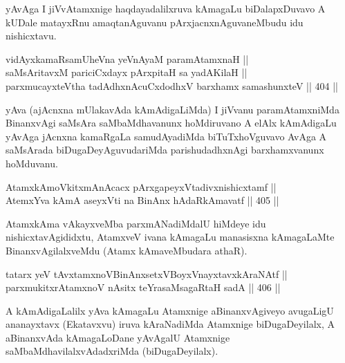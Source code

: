 \begin{artha}
yAvAga I jiVvAtamxnige haqdayadalilxruva kAmagaLu biDalapxDuvavo A
kUDale matayxRnu amaqtanAguvanu pArxjacnxnAguvaneMbudu idu nishicxtavu.
\end{artha}

\begin{shl}
vidAyxkamaRsamUheVna yeVnAyaM paramAtamxnaH || \\
saMsAritavxM pariciCxdayx pArxpitaH sa yadA\s KilaH || \\
parxmucayxteV\s tha tadAdhxnAcuCxdodhxV barxhamx samashunxteV \hfill || 404 ||  
\end{shl}

\begin{artha}
yAva (ajAcnxna mUlakavAda kAmAdigaLiMda) I jiVvanu paramAtamxniMda
BinanxvAgi saMsAra saMbaMdhavanunx hoMdiruvano A elAlx kAmAdigaLu yAvAga
jAcnxna kamaRgaLa samudAyadiMda biTuTxhoVguvavo AvAga A saMsArada
biDugaDeyAguvudariMda parishudadhxnAgi barxhamxvanunx hoMduvanu.
\end{artha}

\begin{shl}
AtamxkAmoVkitxmAnAcacx pArxgapeyxVtadivxnishicxtamf || \\
AtemxYva kAmA aseyxVti na BinAnx hAdaRkAmavatf \hfill || 405 ||  
\end{shl}

\begin{artha}
AtamxkAma vAkayxveMba parxmANadiMdalU hiMdeye idu nishicxtavAgididxtu,
AtamxveV ivana kAmagaLu manasisxna kAmagaLaMte BinanxvAgilalxveMdu
(Atamx kAmaveMbudara athaR).
\end{artha}


\begin{shl}
tatarx yeV tAvxtamxnoV\s BinAnxsetxVBoyxV\s nayxtavxkAraNAtf ||  \\
parxmukitxrAtamxnoV nAsitx teYrasaMsagaRtaH sadA \hfill || 406 ||  
\end{shl}

\begin{artha}
A kAmAdigaLalilx yAva kAmagaLu Atamxnige aBinanxvAgiveyo avugaLigU
ananayxtavx (Ekatavxvu) iruva kAraNadiMda Atamxnige biDugaDeyilalx, A
aBinanxvAda kAmagaLoDane yAvAgalU Atamxnige saMbaMdhavilalxvAdadxriMda
(biDugaDeyilalx).
\end{artha}


